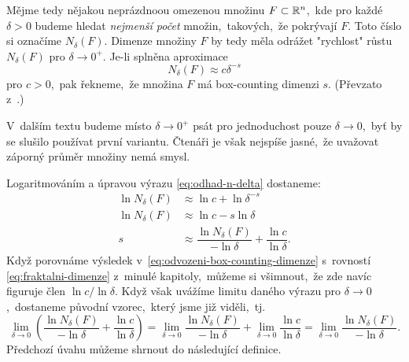 Mějme tedy nějakou neprázdnoou omezenou množinu $F\subset\mathbb{R}^n$,~kde pro každé $\delta>0$ budeme hledat \emph{nejmenší počet} množin,~takových,~že pokrývají $F$. Toto číslo si označíme $N_\delta(F)$. Dimenze množiny $F$ by tedy měla odrážet "rychlost" růstu $N_\delta(F)$ pro $\delta\to 0^+$. Je-li splněna aproximace
\begin{equation}\label{eq:odhad-n-delta}
    N_\delta(F)\approx c\delta^{-s}
\end{equation}
pro $c>0$,~pak řekneme,~že množina $F$ má box-counting dimenzi $s$. (Převzato z~\citep[str. 27]{Falconer2014}.)
\begin{remark}
    V~dalším textu budeme místo $\delta\to 0^+$ psát pro jednoduchost pouze $\delta\to 0$,~byť by se slušilo používat první variantu. Čtenáři je však nejspíše jasné,~že uvažovat záporný průměr množiny nemá smysl.
\end{remark}
Logaritmováním a úpravou výrazu \eqref{eq:odhad-n-delta} dostaneme:
\begin{align}\label{eq:odvozeni-box-counting-dimenze}
    \ln{N_\delta(F)}&\approx\ln{c}+\ln{\delta^{-s}}\\
    \ln{N_\delta(F)}&\approx\ln{c}-s\ln{\delta}\\
    s&\approx\dfrac{\ln{N_\delta(F)}}{-\ln{\delta}}+\dfrac{\ln{c}}{\ln{\delta}}.
\end{align}
Když porovnáme výsledek v~\eqref{eq:odvozeni-box-counting-dimenze} s~rovností \eqref{eq:fraktalni-dimenze} z~minulé kapitoly,~můžeme si všimnout,~že zde navíc figuruje člen $\ln{c}/\ln{\delta}$. Když však uvážíme limitu daného výrazu pro $\delta\to 0$,~dostaneme původní vzorec,~který jsme již viděli,~tj.
\[\lim_{\delta\to 0}\left(\dfrac{\ln{N_\delta(F)}}{-\ln{\delta}}+\dfrac{\ln{c}}{\ln{\delta}}\right)=\lim_{\delta\to 0}\dfrac{\ln{N_\delta(F)}}{-\ln{\delta}}+\lim_{\delta\to 0}\dfrac{\ln{c}}{\ln{\delta}}=\lim_{\delta\to 0}\dfrac{\ln{N_\delta(F)}}{-\ln{\delta}}.\]
Předchozí úvahu můžeme shrnout do následující definice.
